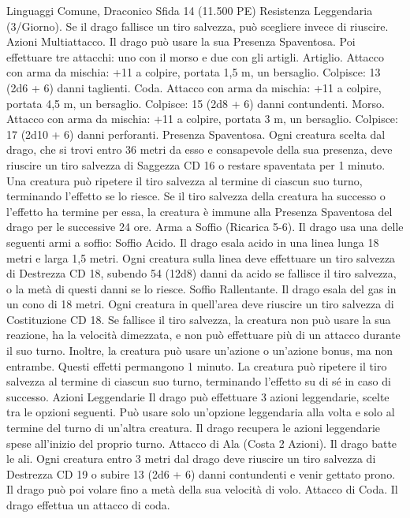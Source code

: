 \begin{multicols}{2}
Linguaggi Comune, Draconico
Sfida 14 (11.500 PE)
Resistenza Leggendaria (3/Giorno). Se il drago fallisce un tiro
salvezza, può scegliere invece di riuscire.
Azioni
Multiattacco. Il drago può usare la sua Presenza Spaventosa. Poi
effettuare tre attacchi: uno con il morso e due con gli artigli.
Artiglio. Attacco con arma da mischia: +11 a colpire, portata 1,5
m, un bersaglio.
Colpisce: 13 (2d6 + 6) danni taglienti.
Coda. Attacco con arma da mischia: +11 a colpire, portata 4,5
m, un bersaglio.
Colpisce: 15 (2d8 + 6) danni contundenti.
Morso. Attacco con arma da mischia: +11 a colpire, portata 3 m,
un bersaglio.
Colpisce: 17 (2d10 + 6) danni perforanti.
Presenza Spaventosa. Ogni creatura scelta dal drago, che si trovi
entro 36 metri da esso e consapevole della sua presenza, deve
riuscire un tiro salvezza di Saggezza CD 16 o restare spaventata per
1 minuto. Una creatura può ripetere il tiro salvezza al termine di
ciascun suo turno, terminando l’effetto se lo riesce. Se il tiro salvezza
della creatura ha successo o l’effetto ha termine per essa, la creatura è
immune alla Presenza Spaventosa del drago per le successive 24 ore.
Arma a Soffio (Ricarica 5-6). Il drago usa una delle seguenti armi
a soffio:
Soffio Acido. Il drago esala acido in una linea lunga 18 metri e larga
1,5 metri. Ogni creatura sulla linea deve effettuare un tiro salvezza di
Destrezza CD 18, subendo 54 (12d8) danni da acido se fallisce il tiro
salvezza, o la metà di questi danni se lo riesce.
Soffio Rallentante. Il drago esala del gas in un cono di 18 metri. Ogni
creatura in quell’area deve riuscire un tiro salvezza di Costituzione
CD 18. Se fallisce il tiro salvezza, la creatura non può usare la sua
reazione, ha la velocità dimezzata, e non può effettuare più di un
attacco durante il suo turno. Inoltre, la creatura può usare un’azione o
un’azione bonus, ma non entrambe. Questi effetti permangono 1
minuto. La creatura può ripetere il tiro salvezza al termine di ciascun
suo turno, terminando l’effetto su di sé in caso di successo.
Azioni Leggendarie
Il drago può effettuare 3 azioni leggendarie, scelte tra le opzioni
seguenti. Può usare solo un’opzione leggendaria alla volta e solo
al termine del turno di un’altra creatura. Il drago recupera le
azioni leggendarie spese all’inizio del proprio turno.
Attacco di Ala (Costa 2 Azioni). Il drago batte le ali. Ogni creatura
entro 3 metri dal drago deve riuscire un tiro salvezza di Destrezza
CD 19 o subire 13 (2d6 + 6) danni contundenti e venir gettato prono.
Il drago può poi volare fino a metà della sua velocità di volo.
Attacco di Coda. Il drago effettua un attacco di coda.

\end{multicols}
